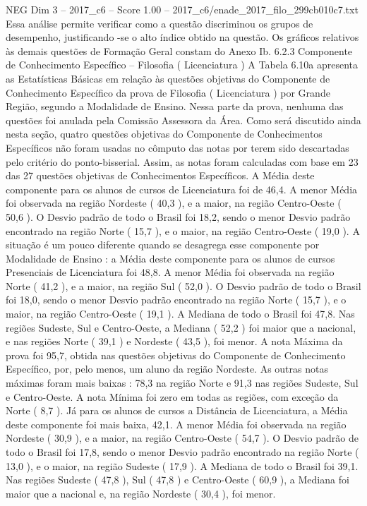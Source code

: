 \begin{textsample}{NEG Dim 3 – 2017\_c6 – Score 1.00 – 2017\_c6/enade\_2017\_filo\_299cb010c7.txt}
Essa análise permite verificar como a questão discriminou os grupos de desempenho, justificando -se o alto índice obtido na questão.
Os gráficos relativos às demais questões de Formação Geral constam do Anexo Ib. 6.2.3 Componente de Conhecimento Específico – Filosofia ( Licenciatura ) A Tabela 6.10a apresenta as Estatísticas Básicas em relação às questões objetivas do Componente de Conhecimento Específico da prova de Filosofia ( Licenciatura ) por Grande Região, segundo a Modalidade de Ensino.
Nessa parte da prova, nenhuma das questões foi anulada pela Comissão Assessora da Área.
Como será discutido ainda nesta seção, quatro questões objetivas do Componente de Conhecimentos Específicos não foram usadas no cômputo das notas por terem sido descartadas pelo critério do ponto-bisserial.
Assim, as notas foram calculadas com base em 23 das 27 questões objetivas de Conhecimentos Específicos.
A Média deste componente para os alunos de cursos de Licenciatura foi de 46,4.
A menor Média foi observada na região Nordeste ( 40,3 ), e a maior, na região Centro-Oeste ( 50,6 ).
O Desvio padrão de todo o Brasil foi 18,2, sendo o menor Desvio padrão encontrado na região Norte ( 15,7 ), e o maior, na região Centro-Oeste ( 19,0 ).
A situação é um pouco diferente quando se desagrega esse componente por Modalidade de Ensino : a Média deste componente para os alunos de cursos Presenciais de Licenciatura foi 48,8.
A menor Média foi observada na região Norte ( 41,2 ), e a maior, na região Sul ( 52,0 ).
O Desvio padrão de todo o Brasil foi 18,0, sendo o menor Desvio padrão encontrado na região Norte ( 15,7 ), e o maior, na região Centro-Oeste ( 19,1 ).
A Mediana de todo o Brasil foi 47,8.
Nas regiões Sudeste, Sul e Centro-Oeste, a Mediana ( 52,2 ) foi maior que a nacional, e nas regiões Norte ( 39,1 ) e Nordeste ( 43,5 ), foi menor.
A nota Máxima da prova foi 95,7, obtida nas questões objetivas do Componente de Conhecimento Específico, por, pelo menos, um aluno da região Nordeste.
As outras notas máximas foram mais baixas : 78,3 na região Norte e 91,3 nas regiões Sudeste, Sul e Centro-Oeste.
A nota Mínima foi zero em todas as regiões, com exceção da Norte ( 8,7 ).
Já para os alunos de cursos a Distância de Licenciatura, a Média deste componente foi mais baixa, 42,1.
A menor Média foi observada na região Nordeste ( 30,9 ), e a maior, na região Centro-Oeste ( 54,7 ).
O Desvio padrão de todo o Brasil foi 17,8, sendo o menor Desvio padrão encontrado na região Norte ( 13,0 ), e o maior, na região Sudeste ( 17,9 ).
A Mediana de todo o Brasil foi 39,1.
Nas regiões Sudeste ( 47,8 ), Sul ( 47,8 ) e Centro-Oeste ( 60,9 ), a Mediana foi maior que a nacional e, na região Nordeste ( 30,4 ), foi menor.

\end{textsample}
